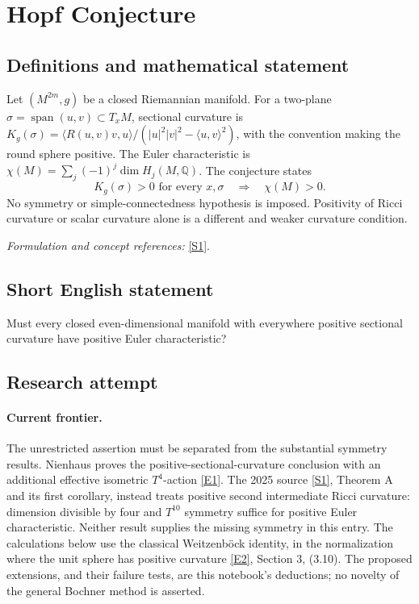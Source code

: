 \documentclass[11pt,a4paper]{article}
\newcommand{\Q}{\mathbb{Q}}
\newcommand{\sref}[2]{\hyperlink{source:#1:#2}{[S#2]}}
\newcommand{\eref}[2]{\hyperlink{extra:#1:#2}{[E#2]}}
\newif\ifshowcatalogue
\newcommand{\cataloguescope}[1]{\ifshowcatalogue
 \paragraph{Exact scope in the supplied catalogue.}
 \begin{quote}\small #1\end{quote}\fi}
\begin{document}
\setcounter{section}{0}
\clearpage
\section*{\texorpdfstring{Hopf Conjecture}{Hopf Conjecture}}\label{30001953}
\subsection{Definitions and mathematical statement}
Let $(M^{2m},g)$ be a closed Riemannian manifold. For a two-plane $\sigma=\operatorname{span}(u,v)\subset T_xM$, sectional curvature is
$K_g(\sigma)=\langle R(u,v)v,u\rangle/(|u|^2|v|^2-\langle u,v\rangle^2)$, with the convention making the round sphere positive. The Euler characteristic is
$\chi(M)=\sum_j(-1)^j\dim H_j(M,\Q)$. The conjecture states
\[
 K_g(\sigma)>0\text{ for every }x,\sigma
 \quad\Longrightarrow\quad\chi(M)>0.
\]
No symmetry or simple-connectedness hypothesis is imposed. Positivity of Ricci curvature or scalar curvature alone is a different and weaker curvature condition.
\par\smallskip\textit{Formulation and concept references:} \sref{30001953}{1}.
\cataloguescope{Prove that every closed even-dimensional Riemannian manifold whose sectional curvatures are everywhere positive has positive Euler characteristic.}
\subsection{Short English statement}
Must every closed even-dimensional manifold with everywhere positive sectional curvature have positive Euler characteristic?
\subsection{Research attempt}

\paragraph{Current frontier.}
The unrestricted assertion must be separated from the substantial symmetry
results. Nienhaus proves the positive-sectional-curvature conclusion with an
additional effective isometric $T^4$-action \eref{30001953}{1}. The 2025 source
\sref{30001953}{1}, Theorem A and its first corollary, instead treats positive second
intermediate Ricci curvature: dimension divisible by four and $T^{10}$ symmetry
suffice for positive Euler characteristic. Neither result supplies the missing
symmetry in this entry. The calculations below use the classical
Weitzenb\"ock identity, in the normalization where the unit sphere has positive
curvature \eref{30001953}{2}, Section 3, (3.10). The proposed extensions, and their
failure tests, are this notebook's deductions; no novelty of the general
Bochner method is asserted.
\end{document}
